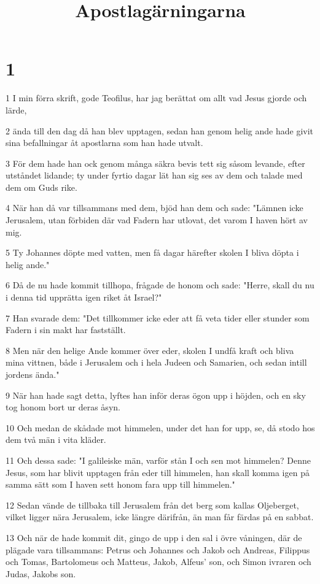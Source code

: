 

\title{Apostlagärningarna}


\chapter{1}

\par 1 I min förra skrift, gode Teofilus, har jag berättat om allt vad Jesus gjorde och lärde,
\par 2 ända till den dag då han blev upptagen, sedan han genom helig ande hade givit sina befallningar åt apostlarna som han hade utvalt.
\par 3 För dem hade han ock genom många säkra bevis tett sig såsom levande, efter utståndet lidande; ty under fyrtio dagar lät han sig ses av dem och talade med dem om Guds rike.
\par 4 När han då var tillsammans med dem, bjöd han dem och sade: "Lämnen icke Jerusalem, utan förbiden där vad Fadern har utlovat, det varom I haven hört av mig.
\par 5 Ty Johannes döpte med vatten, men få dagar härefter skolen I bliva döpta i helig ande."
\par 6 Då de nu hade kommit tillhopa, frågade de honom och sade: "Herre, skall du nu i denna tid upprätta igen riket åt Israel?"
\par 7 Han svarade dem: "Det tillkommer icke eder att få veta tider eller stunder som Fadern i sin makt har fastställt.
\par 8 Men när den helige Ande kommer över eder, skolen I undfå kraft och bliva mina vittnen, både i Jerusalem och i hela Judeen och Samarien, och sedan intill jordens ända."
\par 9 När han hade sagt detta, lyftes han inför deras ögon upp i höjden, och en sky tog honom bort ur deras åsyn.
\par 10 Och medan de skådade mot himmelen, under det han for upp, se, då stodo hos dem två män i vita kläder.
\par 11 Och dessa sade: "I galileiske män, varför stån I och sen mot himmelen? Denne Jesus, som har blivit upptagen från eder till himmelen, han skall komma igen på samma sätt som I haven sett honom fara upp till himmelen."
\par 12 Sedan vände de tillbaka till Jerusalem från det berg som kallas Oljeberget, vilket ligger nära Jerusalem, icke längre därifrån, än man får färdas på en sabbat.
\par 13 Och när de hade kommit dit, gingo de upp i den sal i övre våningen, där de plägade vara tillsammans: Petrus och Johannes och Jakob och Andreas, Filippus och Tomas, Bartolomeus och Matteus, Jakob, Alfeus' son, och Simon ivraren och Judas, Jakobs son.
